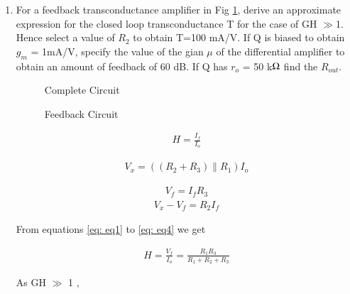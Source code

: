 \begin{enumerate}[label=\thesubsection.\arabic*.,ref=\thesubsection.\theenumi]


\item For a feedback transconductance amplifier in Fig \ref{fig:fig1}, derive an approximate expression for the closed loop transconductance T for the case of GH $\gg$1. Hence select a value of $R_2$ to obtain T=100 mA/V. If Q is biased to obtain $g_m$ = 1mA/V, specify  the value of the gian $\mu$ of the differential amplifier to obtain an amount of feedback of 60 dB. If Q has $r_o$ = 50 k$\ohm$ find the $R_{out}$.
\begin{figure}[!ht]
	\begin{center}
		\resizebox{\columnwidth}{!}{}
	\end{center}
\caption{Complete Circuit}
\label{fig:fig1}
\end{figure}



\solution


\begin{figure}[!ht]
	\begin{center}
		\resizebox{\columnwidth}{!}{}
	\end{center}
\caption{Feedback Circuit}
\label{fig:fig2}
\end{figure}


\begin{align}
H = \frac{I_f}{I_o}
\label{eq: eq1}
\end{align}

\begin{align}
    V_x = ((R_2 + R_3) \| R_1) I_o 
    \label{eq: eq2}
\end{align} 

\begin{align}
V_f = I_f R_3
\label{eq: eq3}
\end{align} 
\begin{align}
V_x - V_f = R_2 I_f
\label{eq: eq4}
\end{align} 

From equations \ref{eq: eq1} to \ref{eq: eq4} we get

\begin{align}
    H = \frac{V_f}{I_o}=\frac{R_1 R_3}{R_1+R_2+R_3}
    \label{eq:eq5}
\end{align}

As GH $\gg$ 1 ,


\end{enumerate}
